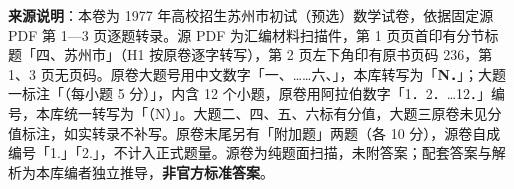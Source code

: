 


\begin{gktip}
\textbf{来源说明}：本卷为 1977 年高校招生苏州市初试（预选）数学试卷，依据固定源 PDF 第 1—3 页逐题转录。源 PDF 为汇编材料扫描件，第 1 页页首印有分节标题「四、苏州市」（H1 按原卷逐字转写），第 2 页左下角印有原书页码 236，第 1、3 页无页码。原卷大题号用中文数字「一、……六、」，本库转写为「\textbf{N．}」；大题一标注「（每小题 5 分）」，内含 12 个小题，原卷用阿拉伯数字「1．2．…12．」编号，本库统一转写为「（N）」。大题二、四、五、六标有分值，大题三原卷未见分值标注，如实转录不补写。原卷末尾另有「附加题」两题（各 10 分），源卷自成编号「1.」「2.」，不计入正式题量。源卷为纯题面扫描，未附答案；配套答案与解析为本库编者独立推导，\textbf{非官方标准答案}。
\end{gktip}

\par\medskip

